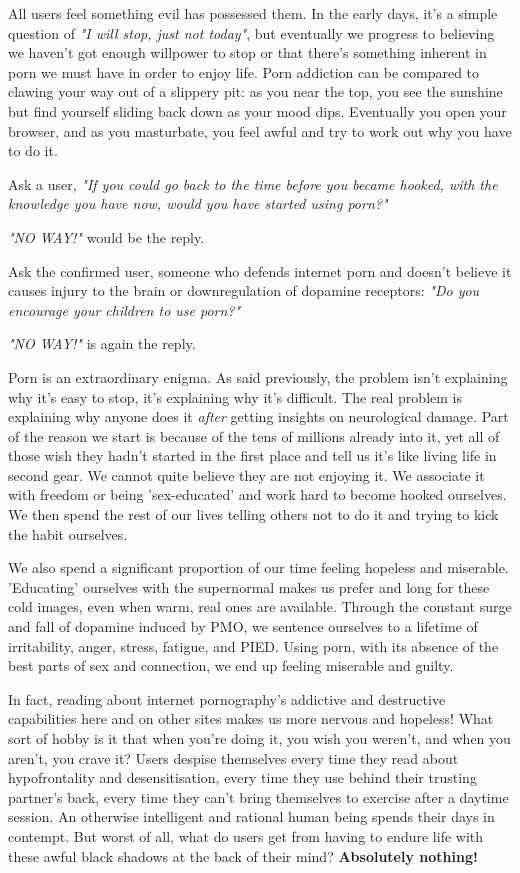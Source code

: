 \documentclass[easypeasy.tex]{subfiles}
\begin{document}
All users feel something evil has possessed them. In the early days, it's a simple question of \textit{"I will stop, just not today"}, but eventually we progress to believing we haven't got enough willpower to stop or that there's something inherent in porn we must have in order to enjoy life. Porn addiction can be compared to clawing your way out of a slippery pit: as you near the top, you see the sunshine but find yourself sliding back down as your mood dips. Eventually you open your browser, and as you masturbate, you feel awful and try to work out why you have to do it.

Ask a user, \textit{"If you could go back to the time before you became hooked, with the knowledge you have now, would you have started using porn?"}

\textit{"NO WAY!"} would be the reply.

Ask the confirmed user, someone who defends internet porn and doesn't believe it causes injury to the brain or downregulation of dopamine receptors: \textit{"Do you encourage your children to use porn?"}

\textit{"NO WAY!"} is again the reply.

Porn is an extraordinary enigma. As said previously, the problem isn't explaining why it's easy to stop, it's explaining why it's difficult. The real problem is explaining why anyone does it \textit{after} getting insights on neurological damage. Part of the reason we start is because of the tens of millions already into it, yet all of those wish they hadn't started in the first place and tell us it's like living life in second gear. We cannot quite believe they are not enjoying it. We associate it with freedom or being 'sex-educated' and work hard to become hooked ourselves. We then spend the rest of our lives telling others not to do it and trying to kick the habit ourselves.

We also spend a significant proportion of our time feeling hopeless and miserable. 'Educating' ourselves with the supernormal makes us prefer and long for these cold images, even when warm, real ones are available. Through the constant surge and fall of dopamine induced by PMO, we sentence ourselves to a lifetime of irritability, anger, stress, fatigue, and PIED. Using porn, with its absence of the best parts of sex and connection, we end up feeling miserable and guilty.

In fact, reading about internet pornography's addictive and destructive capabilities here and on other sites makes us more nervous and hopeless! What sort of hobby is it that when you're doing it, you wish you weren't, and when you aren't, you crave it? Users despise themselves every time they read about hypofrontality and desensitisation, every time they use behind their trusting partner's back, every time they can't bring themselves to exercise after a daytime session. An otherwise intelligent and rational human being spends their days in contempt. But worst of all, what do users get from having to endure life with these awful black shadows at the back of their mind? \textbf{Absolutely nothing!}
\end{document}
